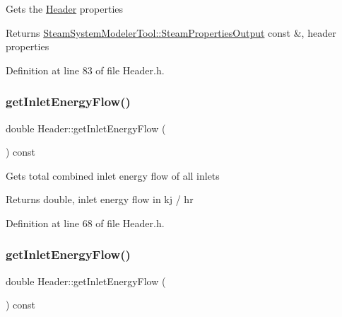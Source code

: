 Gets the \hyperlink{class_header}{Header} properties \begin{DoxyReturn}{Returns}
\hyperlink{struct_steam_system_modeler_tool_1_1_steam_properties_output}{Steam\+System\+Modeler\+Tool\+::\+Steam\+Properties\+Output} const \&, header properties 
\end{DoxyReturn}


Definition at line 83 of file Header.\+h.

\mbox{\label{class_header_a2a30ee96fa76bab1533cb9ceea0c8af3}} 
\subsubsection{\texorpdfstring{get\+Inlet\+Energy\+Flow()}{getInletEnergyFlow()}\hspace{0.1cm}{\footnotesize\ttfamily [1/3]}}
{\footnotesize\ttfamily double Header\+::get\+Inlet\+Energy\+Flow (\begin{DoxyParamCaption}{ }\end{DoxyParamCaption}) const\hspace{0.3cm}{\ttfamily [inline]}}

Gets total combined inlet energy flow of all inlets \begin{DoxyReturn}{Returns}
double, inlet energy flow in kj / hr 
\end{DoxyReturn}


Definition at line 68 of file Header.\+h.

\mbox{\label{class_header_a2a30ee96fa76bab1533cb9ceea0c8af3}} 
\subsubsection{\texorpdfstring{get\+Inlet\+Energy\+Flow()}{getInletEnergyFlow()}\hspace{0.1cm}{\footnotesize\ttfamily [2/3]}}
{\footnotesize\ttfamily double Header\+::get\+Inlet\+Energy\+Flow (\begin{DoxyParamCaption}{ }\end{DoxyParamCaption}) const\hspace{0.3cm}{\ttfamily [inline]}}

